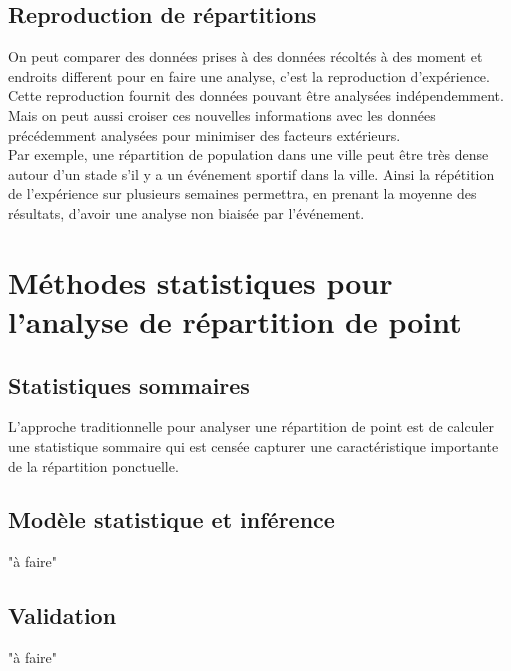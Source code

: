\documentclass[french,12pt,a4paper]{report}
\begin{document}
\subsection{Reproduction de répartitions}
On peut comparer des données prises à des données récoltés à des moment et endroits different pour en faire une analyse, c'est la reproduction d'expérience.\\
Cette reproduction fournit des données pouvant être analysées indépendemment. Mais on peut aussi croiser ces nouvelles informations avec les données précédemment analysées pour minimiser des facteurs extérieurs.\\
Par exemple, une répartition de population dans une ville peut être très dense autour d'un stade s'il y a un événement sportif dans la ville. Ainsi la répétition de l'expérience sur plusieurs semaines permettra, en prenant la moyenne des résultats, d'avoir une analyse non biaisée par l'événement.\\


\section{Méthodes statistiques pour l'analyse de répartition de point}

\subsection{Statistiques sommaires}
L'approche traditionnelle pour analyser une répartition de point est de calculer une statistique sommaire qui est censée capturer une caractéristique importante de la répartition ponctuelle.\\

\subsection{Modèle statistique et inférence}
"à faire"\\

\subsection{Validation}
"à faire"\\

\end{document}
